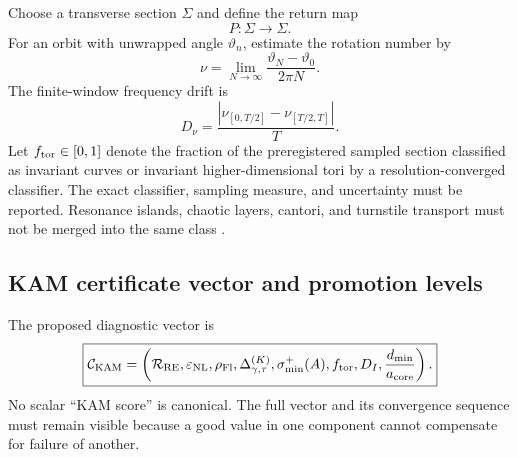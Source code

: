 Choose a transverse section \(\Sigma\) and define the return map
\begin{equation}
    P:\Sigma\rightarrow\Sigma.
    \label{eq:rt_kam_poincare_map}
\end{equation}
For an orbit with unwrapped angle \(\vartheta_n\), estimate the rotation number
by
\begin{equation}
    \nu
    =
    \lim_{N\rightarrow\infty}
    \frac{\vartheta_N-\vartheta_0}{2\pi N}.
    \label{eq:rt_kam_numerical_rotation_number}
\end{equation}
The finite-window frequency drift is
\begin{equation}
    D_{\nu}
    =
    \frac{
    |\nu_{[0,T/2]}-\nu_{[T/2,T]}|
    }{T}.
    \label{eq:rt_kam_frequency_drift}
\end{equation}
Let \(f_{\rm tor}\in[0,1]\) denote the fraction of the preregistered sampled
section classified as invariant curves or invariant higher-dimensional tori by
a resolution-converged classifier.  The exact classifier, sampling measure,
and uncertainty must be reported.  Resonance islands, chaotic layers,
cantori, and turnstile transport must not be merged into the same class
\cite{MacKayMeissPercival1984}.

\subsection{KAM certificate vector and promotion levels}
\label{subsec:rt_kam_certificate}

The proposed diagnostic vector is
\begin{equation}
    \boxed{
    \mathcal C_{\rm KAM}
    =
    \left(
    \mathcal R_{\rm RE},
    \varepsilon_{\rm NL},
    \rho_{\rm Fl},
    \Delta_{\gamma,\tau}^{(K)},
    \sigma_{\min}^{+}(A),
    f_{\rm tor},
    D_I,
    \frac{d_{\min}}{a_{\rm core}}
    \right).
    }
    \label{eq:rt_kam_certificate_vector}
\end{equation}
No scalar ``KAM score'' is canonical.  The full vector and its convergence
sequence must remain visible because a good value in one component cannot
compensate for failure of another.


